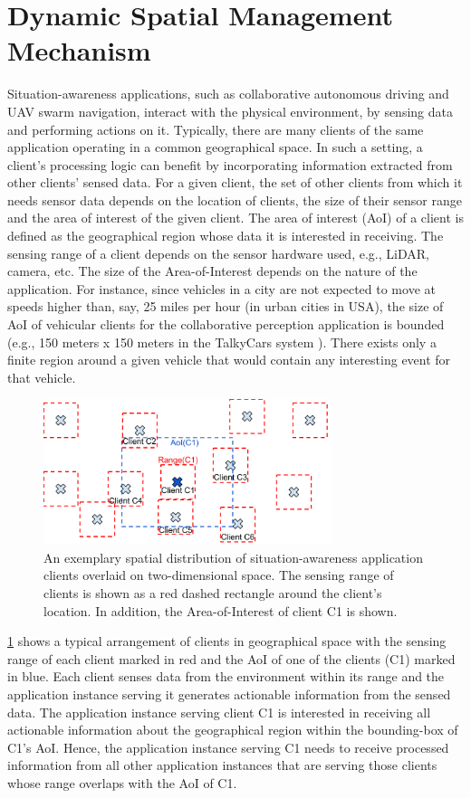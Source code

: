 \section{Dynamic Spatial Management Mechanism}
\label{sec:spatial_ctx_mgmt}

Situation-awareness applications, such as collaborative autonomous driving and UAV swarm navigation, interact with the physical environment, by sensing data and performing actions on it. Typically, there are many clients of the same application operating in a common geographical space. In such a setting, a client's processing logic can benefit by incorporating information extracted from other clients' sensed data. For a given client, the set of other clients from which it needs sensor data depends on the location of clients, the size of their sensor range and the area of interest of the given client. The area of interest (AoI) of a client is defined as the geographical region whose data it is interested in receiving. The sensing range of a client depends on the sensor hardware used, e.g., LiDAR, camera, etc. The size of the Area-of-Interest depends on the nature of the application. For instance, since vehicles in a city are not expected to move at speeds higher than, say, 25 miles per hour (in urban cities in USA), the size of AoI of vehicular clients for the collaborative perception application is bounded (e.g., 150 meters x 150 meters in the TalkyCars system \cite{talkycars}). There exists only a finite region around a given vehicle that would contain any interesting event for that vehicle.
\begin{figure}
\centering
\includegraphics[width=0.75\textwidth]{figures/mechanisms/spatial_ctx_mgmt/aoi_range.pdf}
\caption{An exemplary spatial distribution of situation-awareness application clients overlaid on two-dimensional space. The sensing range of clients is shown as a red dashed rectangle around the client's location. In addition, the Area-of-Interest of client C1 is shown.}
\label{fig:aoi_range}
\end{figure}
\cref{fig:aoi_range} shows a typical arrangement of clients in geographical space with the sensing range of each client marked in red and the AoI of one of the clients (C1) marked in blue. Each client senses data from the environment within its range and the application instance serving it generates actionable information from the sensed data. The application instance serving client C1 is interested in receiving all actionable information about the geographical region within the bounding-box of C1's AoI. Hence, the application instance serving C1 needs to receive processed information from all other application instances that are serving those clients whose range overlaps with the AoI of C1. 


